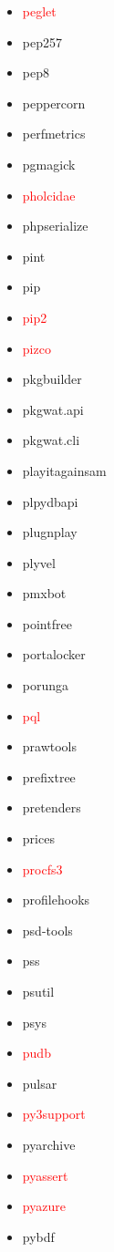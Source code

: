 \documentclass{l4proj}
\begin{document}
\begin{appendices}
{\begin{itemize}
\item\textcolor{red}{peglet}
\item pep257
\item pep8
\item peppercorn
\item perfmetrics
\item pgmagick
\item\textcolor{red}{pholcidae}
\item phpserialize
\item pint
\item pip
\item\textcolor{red}{pip2}
\end{itemize}
}%
\noindent\parbox[t]{0.32\textwidth}{\raggedright%
\begin{itemize}
\item\textcolor{red}{pizco}
\item pkgbuilder
\item pkgwat.api
\item pkgwat.cli
\item playitagainsam
\item plpydbapi
\item plugnplay
\item plyvel
\item pmxbot
\item pointfree
\item portalocker
\item porunga
\item\textcolor{red}{pql}
\item prawtools
\item prefixtree
\item pretenders
\item prices
\item\textcolor{red}{procfs3}
\item profilehooks
\item psd-tools
\item pss
\item psutil
\item psys
\item\textcolor{red}{pudb}
\item pulsar
\item\textcolor{red}{py3support}
\item pyarchive
\item\textcolor{red}{pyassert}
\item\textcolor{red}{pyazure}
\item pybdf
\end{itemize}
}
\end{appendices}
\end{document}
